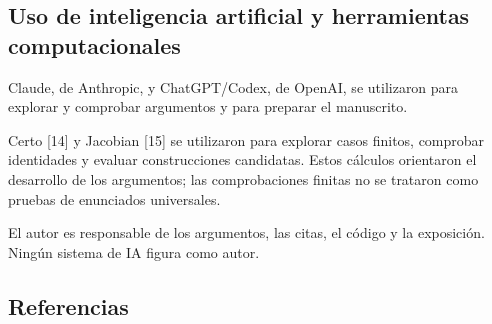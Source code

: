 \documentclass[spanish,11pt,a4paper]{article}
\begin{document}
\subsection{Uso de inteligencia artificial y herramientas computacionales}\label{uso-de-inteligencia-artificial-y-herramientas-computacionales}

Claude, de Anthropic, y ChatGPT/Codex, de OpenAI, se utilizaron para explorar y comprobar argumentos y para preparar el manuscrito.

Certo {[}14{]} y Jacobian {[}15{]} se utilizaron para explorar casos finitos, comprobar identidades y evaluar construcciones candidatas. Estos cálculos orientaron el desarrollo de los argumentos; las comprobaciones finitas no se trataron como pruebas de enunciados universales.

El autor es responsable de los argumentos, las citas, el código y la exposición. Ningún sistema de IA figura como autor.

\subsection{Referencias}\label{referencias}
\end{document}
